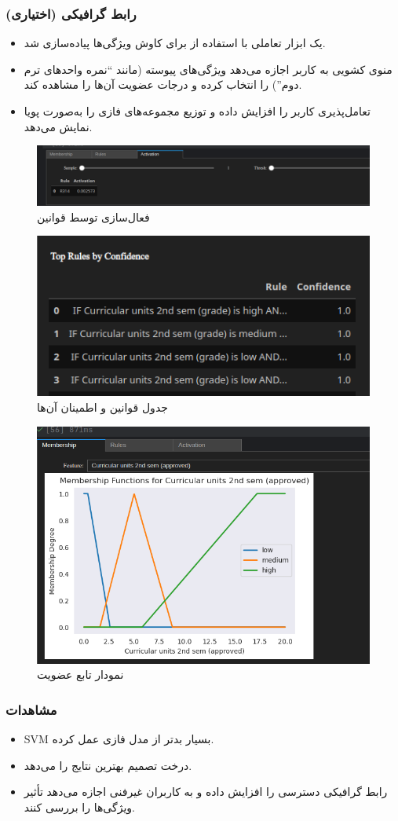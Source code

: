\subsubsection{رابط گرافیکی (اختیاری)}

\begin{itemize}
	\item یک ابزار تعاملی با استفاده از  برای کاوش ویژگی‌ها پیاده‌سازی شد.
	\item منوی کشویی به کاربر اجازه می‌دهد ویژگی‌های پیوسته (مانند ``نمره واحدهای ترم دوم'') را انتخاب کرده و درجات عضویت آن‌ها را مشاهده کند.
	\item تعامل‌پذیری کاربر را افزایش داده و توزیع مجموعه‌های فازی را به‌صورت پویا نمایش می‌دهد.
\end{itemize}

\begin{figure}[H]
	\centering
	\includegraphics[width=0.7\linewidth]{img/activation}
	\caption[]{فعال‌سازی توسط قوانین}
	\label{fig:activation}
\end{figure}
\begin{figure}[H]
	\centering
	\includegraphics[width=0.7\linewidth]{img/rulescong}
	\caption[]{جدول قوانین و اطمینان آن‌ها}
	\label{fig:rulescong}
\end{figure}
\begin{figure}[H]
	\centering
	\includegraphics[width=0.7\linewidth]{img/memberfunc}
	\caption{نمودار تابع عضویت}
	\label{fig:memberfunc}
\end{figure}


\subsubsection{مشاهدات}

\begin{itemize}
	\item SVM بسیار بدتر از مدل فازی عمل کرده.
	\item درخت تصمیم بهترین نتایج را می‌دهد.
	\item رابط گرافیکی دسترسی را افزایش داده و به کاربران غیر‌فنی اجازه می‌دهد تأثیر ویژگی‌ها را بررسی کنند.
\end{itemize}



